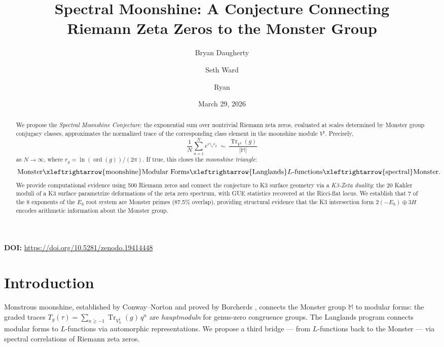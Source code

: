 \documentclass[11pt]{amsart}
\title[Spectral Moonshine]{Spectral Moonshine: A Conjecture Connecting\\Riemann Zeta Zeros to the Monster Group}
\author{Bryan Daugherty}
\author{Seth Ward}
\author{Ryan}
\date{March 29, 2026}
\theoremstyle{definition}
\begin{document}
\begin{abstract}
We propose the \emph{Spectral Moonshine Conjecture}: the exponential sum over nontrivial Riemann zeta zeros, evaluated at scales determined by Monster group conjugacy classes, approximates the normalized trace of the corresponding class element in the moonshine module $V^\natural$. Precisely,
\[
\frac{1}{N}\sum_{n=1}^{N} e^{i\gamma_n r_g} \;\sim\; \frac{\operatorname{Tr}_{V^\natural}(g)}{|\mathbb{M}|}
\]
as $N \to \infty$, where $r_g = \ln(\operatorname{ord}(g))/(2\pi)$. If true, this closes the \emph{moonshine triangle}:
\[
\text{Monster} \xleftrightarrow{\text{moonshine}} \text{Modular Forms} \xleftrightarrow{\text{Langlands}} \text{$L$-functions} \xleftrightarrow{\text{spectral}} \text{Monster}.
\]
We provide computational evidence using 500 Riemann zeros and connect the conjecture to K3 surface geometry via a \emph{K3-Zeta duality}: the 20 Kahler moduli of a K3 surface parametrize deformations of the zeta zero spectrum, with GUE statistics recovered at the Ricci-flat locus. We establish that 7 of the 8 exponents of the $E_8$ root system are Monster primes (87.5\% overlap), providing structural evidence that the K3 intersection form $2(-E_8) \oplus 3H$ encodes arithmetic information about the Monster group.
\end{abstract}

\vspace{0.5em}
\noindent\textbf{DOI:} \url{https://doi.org/10.5281/zenodo.19414448}

\maketitle
\tableofcontents

\section{Introduction}

Monstrous moonshine, established by Conway--Norton \cite{conway1979} and proved by Borcherds \cite{borcherds1992}, connects the Monster group $\mathbb{M}$ to modular forms: the graded traces $T_g(\tau) = \sum_{n \geq -1} \operatorname{Tr}_{V_n^\natural}(g)\, q^n$ are \emph{hauptmoduln} for genus-zero congruence groups. The Langlands program connects modular forms to $L$-functions via automorphic representations. We propose a third bridge --- from $L$-functions back to the Monster --- via spectral correlations of Riemann zeta zeros.
\end{document}
